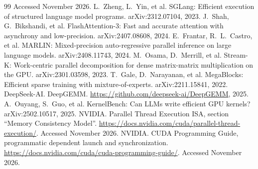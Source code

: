 \documentclass[11pt]{article}
\begin{document}
\begin{thebibliography}{99}
Accessed November 2026.
 L.~Zheng, L.~Yin, et al. SGLang: Efficient execution of
structured language model programs. arXiv:2312.07104, 2023.
 J.~Shah, G.~Bikshandi, et al. FlashAttention-3: Fast and accurate
attention with asynchrony and low-precision. arXiv:2407.08608, 2024.
 E.~Frantar, R.~L.~Castro, et al. MARLIN: Mixed-precision
auto-regressive parallel inference on large language models. arXiv:2408.11743,
2024.
 M.~Osama, D.~Merrill, et al. Stream-K: Work-centric parallel
decomposition for dense matrix-matrix multiplication on the GPU.
arXiv:2301.03598, 2023.
 T.~Gale, D.~Narayanan, et al. MegaBlocks: Efficient sparse
training with mixture-of-experts. arXiv:2211.15841, 2022.
 DeepSeek-AI. DeepGEMM.
\url{https://github.com/deepseek-ai/DeepGEMM}, 2025.
 A.~Ouyang, S.~Guo, et al. KernelBench: Can LLMs write
efficient GPU kernels? arXiv:2502.10517, 2025.
 NVIDIA. Parallel Thread Execution ISA, section ``Memory Consistency Model''.
\url{https://docs.nvidia.com/cuda/parallel-thread-execution/}. Accessed November
2026.
 NVIDIA. CUDA Programming Guide, programmatic dependent
launch and synchronization.
\url{https://docs.nvidia.com/cuda/cuda-programming-guide/}. Accessed November
2026.
\end{thebibliography}

\clearpage
\appendix
\end{document}
